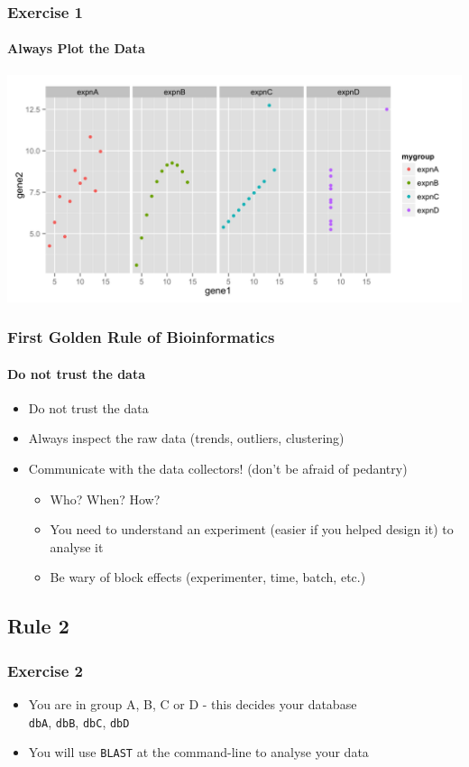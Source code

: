 \documentclass[table]{beamer}
\begin{document}
  \begin{frame}
    \frametitle{Exercise 1}
    \framesubtitle{Always Plot the Data}
    \begin{center}
      \includegraphics[width=\textwidth]{images/ex1_rplot} \\
    \end{center}
  \end{frame}

  \begin{frame}
    \frametitle{First Golden Rule of Bioinformatics}
    \framesubtitle{Do not trust the data}
	\begin{itemize}
	  \item Do not trust the data
	  \item Always inspect the raw data (trends, outliers, clustering)
	  \item Communicate with the data collectors! (don't be afraid of pedantry)
	  \begin{itemize}
	    \item Who? When? How?
	    \item You need to understand an experiment (easier if you helped design it) to analyse it
	    \item Be wary of block effects (experimenter, time, batch, etc.)
	  \end{itemize}
	\end{itemize}
  \end{frame}

  \subsection{Rule 2}
  \begin{frame}
    \frametitle{Exercise 2}
    \begin{itemize}
      \item You are in group A, B, C or D - this decides your database\\
      \texttt{dbA}, \texttt{dbB}, \texttt{dbC}, \texttt{dbD}
      \item You will use \texttt{BLAST} at the command-line to analyse your data
    \end{itemize}
  \end{frame}
\end{document}
